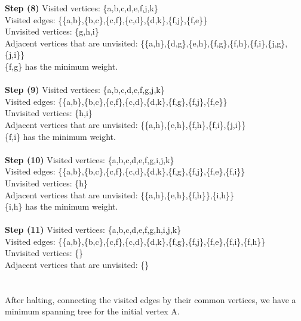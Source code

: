 \documentclass[11pt]{article}
\begin{document}
\textbf{Step (8)} 
Visited vertices: \{a,b,c,d,e,f,j,k\}\\
Visited edges: \{\{a,b\},\{b,c\},\{c,f\},\{c,d\},\{d,k\},\{f,j\},\{f,e\}\}\\
Unvisited vertices: \{g,h,i\}\\
Adjacent vertices that are unvisited: \{\{a,h\},\{d,g\},\{e,h\},\{f,g\},\{f,h\},\{f,i\},\{j,g\},\{j,i\}\}\\
\{f,g\} has the minimum weight.
\\ \\
\textbf{Step (9)} 
Visited vertices: \{a,b,c,d,e,f,g,j,k\}\\
Visited edges: \{\{a,b\},\{b,c\},\{c,f\},\{c,d\},\{d,k\},\{f,g\},\{f,j\},\{f,e\}\}\\
Unvisited vertices: \{h,i\}\\
Adjacent vertices that are unvisited: \{\{a,h\},\{e,h\},\{f,h\},\{f,i\},\{j,i\}\}\\
\{f,i\} has the minimum weight.
\\ \\
\textbf{Step (10)} 
Visited vertices: \{a,b,c,d,e,f,g,i,j,k\}\\
Visited edges: \{\{a,b\},\{b,c\},\{c,f\},\{c,d\},\{d,k\},\{f,g\},\{f,j\},\{f,e\},\{f,i\}\}\\
Unvisited vertices: \{h\}\\
Adjacent vertices that are unvisited: \{\{a,h\},\{e,h\},\{f,h\}\},\{i,h\}\}\\
\{i,h\} has the minimum weight.
\\ \\
\textbf{Step (11)} 
Visited vertices: \{a,b,c,d,e,f,g,h,i,j,k\}\\
Visited edges: \{\{a,b\},\{b,c\},\{c,f\},\{c,d\},\{d,k\},\{f,g\},\{f,j\},\{f,e\},\{f,i\},\{f,h\}\}\\
Unvisited vertices: \{\}\\
Adjacent vertices that are unvisited: \{\}\\
\\ \\
After halting, connecting the visited edges by their common vertices, we have a minimum spanning
tree for the initial vertex A.
\\ \\
\end{document}
